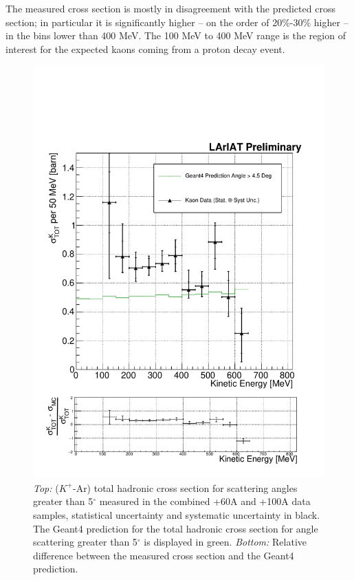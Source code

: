 The measured cross section is mostly in disagreement with the predicted cross section; in particular it is significantly higher -- on the order of 20\%-30\% higher -- in the bins lower than 400 MeV. The 100 MeV to 400 MeV range is the region of interest for the expected kaons coming from a proton decay event. 

\begin{figure}[htb]
\centering
\includegraphics[width=\textwidth]{Chapter-7/Images/TheMoneyPlotK.pdf}
\caption{ \emph{Top:} ($K^+$-Ar) total hadronic cross section for  scattering angles greater than 5$^\circ$ measured in the combined +60A and +100A data samples, statistical uncertainty and systematic uncertainty in black. The Geant4 prediction for the total hadronic cross section for angle scattering greater than 5$^\circ$ is displayed in green. \emph{Bottom:} Relative difference between the measured cross section and the Geant4 prediction.} 
\label{fig:FinalXSKaon}
\end{figure}

